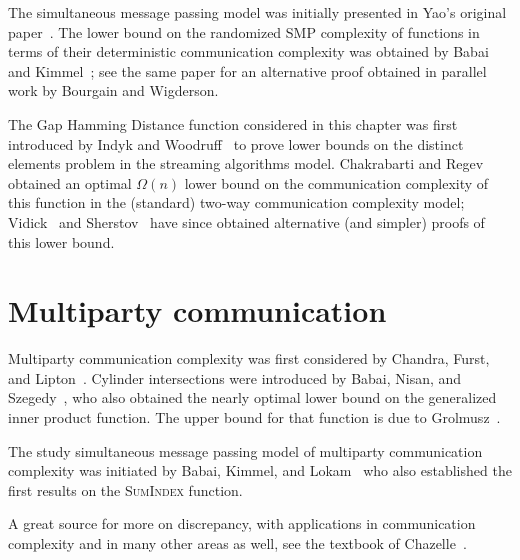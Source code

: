 The simultaneous message passing model was initially presented in Yao's original paper~\cite{Yao79}. The lower bound on the randomized SMP complexity of functions in terms of their deterministic communication complexity was obtained by Babai and Kimmel~\cite{BabaiK97}; see the same paper for an alternative proof obtained in parallel work by Bourgain and Wigderson.

The Gap Hamming Distance function considered in this chapter was first introduced by Indyk and Woodruff~\cite{IndykW03} to prove lower bounds on the distinct elements problem in the streaming algorithms model. Chakrabarti and Regev~\cite{ChakrabartiR12} obtained an optimal $\Omega(n)$ lower bound on the communication complexity of this function in the (standard) two-way communication complexity model; Vidick~\cite{Vidick13} and Sherstov~\cite{Sherstov12ghd} have since obtained alternative (and simpler) proofs of this lower bound.

\section{Multiparty communication}

Multiparty communication complexity was first considered by Chandra, Furst, and Lipton~\cite{ChandraFL83b}. Cylinder intersections were introduced by Babai, Nisan, and Szegedy~\cite{BabaiNS92}, who also obtained the nearly optimal lower bound on the generalized inner product function. The upper bound for that function is due to Grolmusz~\cite{Grolmusz94}.

The study simultaneous message passing model of multiparty communication complexity was initiated by Babai, Kimmel, and Lokam~\cite{BabaiKL95} who also established the first results on the \textsc{SumIndex} function.

A great source for more on discrepancy, with applications in communication complexity and in many other areas as well, see the textbook of Chazelle~\cite{Chazelle01}.
